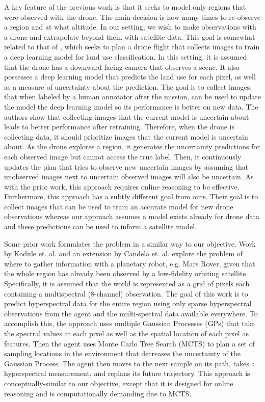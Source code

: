A key feature of the previous work is that it seeks to model only regions that were observed with the drone. The main decision is how many times to re-observe a region and at what altitude. In our setting, we wish to make observations with a drone and extrapolate beyond them with satellite data. This goal is somewhat related to that of \cite{Ruckin2022}, which seeks to plan a drone flight that collects images to train a deep learning model for land use classification. In this setting, it is assumed that the drone has a downward-facing camera that observes a scene. It also possesses a deep learning model that predicts the land use for each pixel, as well as a measure of uncertainty about the prediction. The goal is to collect images, that when labeled by a human annotator after the mission, can be used to update the model the deep learning model so its performance is better on new data. The authors show that collecting images that the current model is uncertain about leads to better performance after retraining. Therefore, when the drone is collecting data, it should prioritize images that the current model is uncertain about. As the drone explores a region, it generates the uncertainty predictions for each observed image but cannot access the true label. Then, it continuously updates the plan that tries to observe new uncertain images by assuming that unobserved images next to uncertain observed images will also be uncertain. As with the prior work, this approach requires online reasoning to be effective. Furthermore, this approach has a subtly different goal from ours. Their goal is to collect images that can be used to train an accurate model for new drone observations whereas our approach assumes a model exists already for drone data and these predictions can be used to inform a satellite model. 

Some prior work formulates the problem in a similar way to our objective. Work by Kodule et. al. \cite{Kodgule2019Non-myopicMeasurements} and an extension by Candela et. al. \cite{Candela2020PlanetaryMapping} explore the problem of where to gather information with a planetary robot, e.g. Mars Rover, given that the whole region has already been observed by a low-fidelity orbiting satellite. Specifically, it is assumed that the world is represented as a grid of pixels each containing a multispectral (8-channel) observation. The goal of this work is to predict hyperspectral data for the entire region using only sparse hyperspectral observations from the agent and the multi-spectral data available everywhere. To accomplish this, the approach uses multiple Gaussian Processes (GPs) \cite{Rasmussen2004} that take the spectral values at each pixel as well as the spatial location of each pixel as features. Then the agent uses Monte Carlo Tree Search (MCTS) \cite{Browne2012AMethodsEdited} to plan a set of sampling locations in the environment that decreases the uncertainty of the Gaussian Process. The agent then moves to the next sample on its path, takes a hyperspectral measurement, and replans its future trajectory. This approach is conceptually-similar to our objective, except that it is designed for online reasoning and is computationally demanding due to MCTS.

